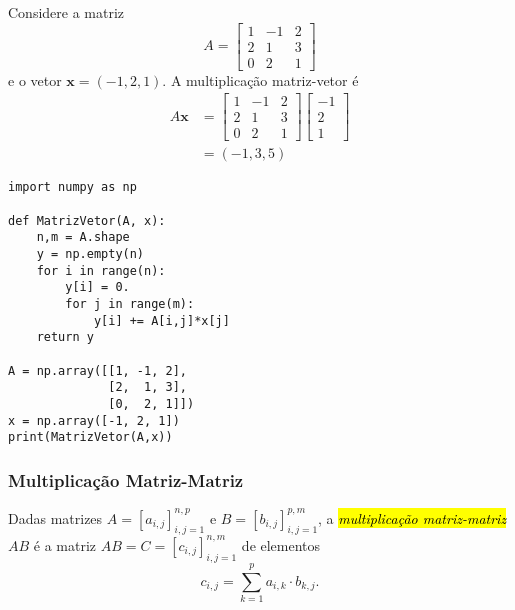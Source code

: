 \begin{ex}
  Considere a matriz
  \begin{equation}
    A =
    \begin{bmatrix}
      1 & -1 & 2\\
      2 & 1 & 3\\
      0 & 2 & 1
    \end{bmatrix}
  \end{equation}
  e o vetor $\pmb{x} = (-1, 2, 1)$. A multiplicação matriz-vetor é
  \begin{subequations}
    \begin{align}
      A\pmb{x} &= \begin{bmatrix}
        1 & -1 & 2\\
        2 & 1 & 3\\
        0 & 2 & 1
      \end{bmatrix}
      \begin{bmatrix}
        -1\\
        2\\
        1
      \end{bmatrix}\\
               &= (-1, 3, 5)
    \end{align}
   \end{subequations}

\begin{lstlisting}
import numpy as np

def MatrizVetor(A, x):
    n,m = A.shape
    y = np.empty(n)
    for i in range(n):
        y[i] = 0.
        for j in range(m):
            y[i] += A[i,j]*x[j]
    return y

A = np.array([[1, -1, 2],
              [2,  1, 3],
              [0,  2, 1]])
x = np.array([-1, 2, 1])
print(MatrizVetor(A,x))
\end{lstlisting}

\end{ex}

\subsubsection{Multiplicação Matriz-Matriz}

Dadas matrizes $A = [a_{i,j}]_{i,j=1}^{n,p}$ e $B = [b_{i,j}]_{i,j=1}^{p,m}$, a \hl{\emph{multiplicação matriz-matriz}} $AB$ é a matriz $AB = C = [c_{i,j}]_{i,j=1}^{n,m}$ de elementos
\begin{equation}
  c_{i,j} = \sum_{k=1}^{p} a_{i,k}\cdot b_{k,j}.
\end{equation}

